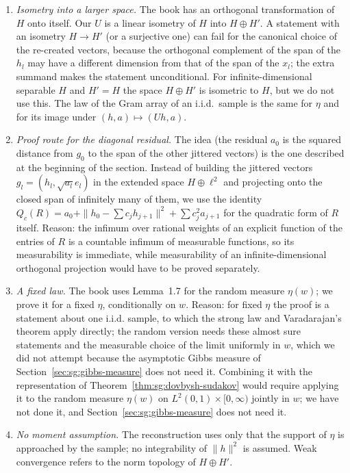 \begin{remark}\label{rem:sg:reconstruction-deviation}
\begin{enumerate}
\item \emph{Isometry into a larger space.} The book has an orthogonal transformation of $H$ onto itself. Our $U$ is a linear isometry of $H$ into $H\oplus H'$. A statement with an isometry $H\to H'$ (or a surjective one) can fail for the canonical choice of the re-created vectors, because the orthogonal complement of the span of the $h_l$ may have a different dimension from that of the span of the $x_l$; the extra summand makes the statement unconditional. For infinite-dimensional separable $H$ and $H'=H$ the space $H\oplus H'$ is isometric to $H$, but we do not use this. The law of the Gram array of an i.i.d.\ sample is the same for $\eta$ and for its image under $(h,a)\mapsto(Uh,a)$.
\item \emph{Proof route for the diagonal residual.} The idea (the residual $a_0$ is the squared distance from $g_0$ to the span of the other jittered vectors) is the one described at the beginning of the section. Instead of building the jittered vectors $g_l=(h_l,\sqrt{a_l}e_l)$ in the extended space $H\oplus\ell^2$ and projecting onto the closed span of infinitely many of them, we use the identity $Q_c(R)=a_0+\|h_0-\sum c_jh_{j+1}\|^2+\sum c_j^2a_{j+1}$ for the quadratic form of $R$ itself. Reason: the infimum over rational weights of an explicit function of the entries of $R$ is a countable infimum of measurable functions, so its measurability is immediate, while measurability of an infinite-dimensional orthogonal projection would have to be proved separately.
\item \emph{A fixed law.} The book uses Lemma~1.7 for the random measure $\eta(w)$; we prove it for a fixed $\eta$, conditionally on $w$. Reason: for fixed $\eta$ the proof is a statement about one i.i.d. sample, to which the strong law and Varadarajan's theorem apply directly; the random version needs these almost sure statements and the measurable choice of the limit uniformly in $w$, which we did not attempt because the asymptotic Gibbs measure of Section~\ref{sec:sg:gibbs-measure} does not need it. Combining it with the representation of Theorem~\ref{thm:sg:dovbysh-sudakov} would require applying it to the random measure $\eta(w)$ on $L^2(0,1)\times[0,\infty)$ jointly in $w$; we have not done it, and Section~\ref{sec:sg:gibbs-measure} does not need it.
\item \emph{No moment assumption.} The reconstruction uses only that the support of $\eta$ is approached by the sample; no integrability of $\|h\|^2$ is assumed. Weak convergence refers to the norm topology of $H\oplus H'$.

\end{enumerate}
\end{remark}

